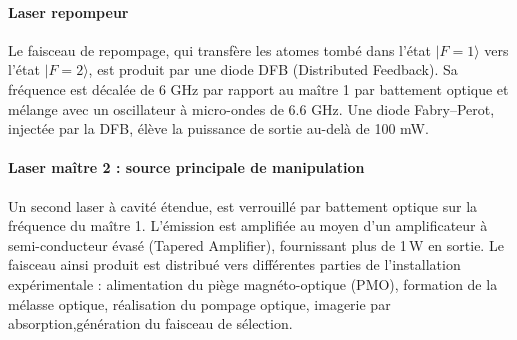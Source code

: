 \paragraph{Laser repompeur}
Le faisceau de repompage, qui transfère les atomes tombé  dans l’état $|F=1\rangle$ vers l’état $|F=2\rangle$, est produit par une diode DFB (Distributed Feedback). Sa fréquence est décalée de 6 GHz par rapport au maître 1 par battement optique et mélange avec un oscillateur à micro-ondes de 6.6 GHz. Une diode Fabry–Perot, injectée par la DFB, élève la puissance de sortie au-delà de 100 mW.


\paragraph{Laser maître 2 : source principale de manipulation}
Un second laser à cavité étendue, est verrouillé par battement optique sur la fréquence du maître 1. L’émission est amplifiée au moyen d’un amplificateur à semi-conducteur évasé (Tapered Amplifier), fournissant plus de 1\,W en sortie. Le faisceau ainsi produit est distribué vers différentes parties de l’installation expérimentale : alimentation du piège magnéto-optique (PMO), formation de la mélasse optique, réalisation du pompage optique, imagerie par absorption,génération du faisceau de sélection.




